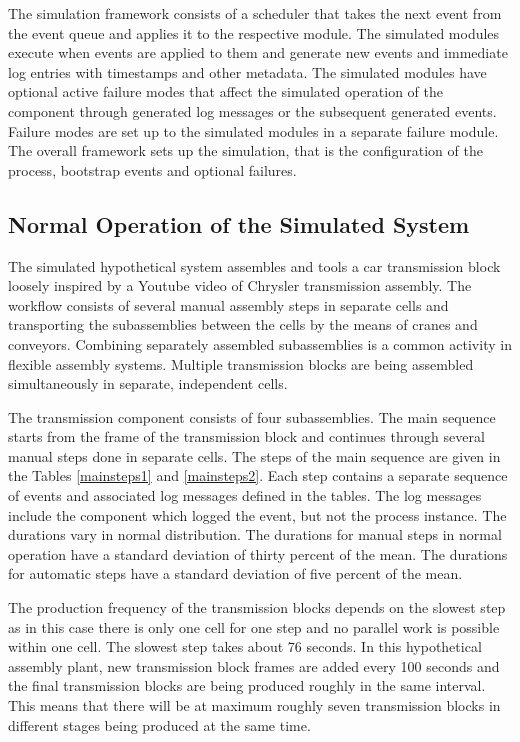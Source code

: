 \documentclass[journal]{IEEEtran}
\begin{document}
The simulation framework consists of a scheduler that takes the next event from the event queue and applies it to the respective module. The simulated modules
execute when events are applied to them and generate new events and immediate log entries with timestamps and other metadata.
The simulated modules have optional active failure modes that affect the simulated operation of the component through
generated log messages or the subsequent generated events. Failure modes are set up to the simulated modules in a separate failure module.
The overall framework sets up the simulation, that is the configuration of the process, bootstrap events and optional failures.

\subsection{Normal Operation of the Simulated System}
The simulated hypothetical system assembles and tools a car transmission block loosely inspired by a Youtube video of Chrysler transmission assembly\cite{transmission}.
The workflow consists of several manual assembly steps in separate cells and transporting the subassemblies between the cells by the means of
cranes and conveyors. Combining separately assembled subassemblies is a common activity in flexible assembly systems\cite{el1989simulation}.
Multiple transmission blocks are being assembled simultaneously in separate, independent cells.

The transmission component consists of four subassemblies. The main sequence starts from the frame of the transmission block
and continues through several manual steps done in separate cells. The steps of the main sequence are given in
the Tables \ref{mainsteps1} and \ref{mainsteps2}.
Each step contains a separate sequence of events and associated log messages defined in the tables. The log messages include the component which logged the event, but
not the process instance.
The durations vary in normal distribution. The durations for manual steps in normal operation have a standard deviation of thirty percent of the mean. The durations for automatic steps
have a standard deviation of five percent of the mean.

The production frequency of the transmission blocks depends on the slowest step as in this case there is only one cell for one step and no
parallel work is possible within one cell. The slowest step takes about 76 seconds. In this hypothetical assembly plant, new transmission block
frames are added every 100 seconds and the final transmission blocks are being produced roughly in the same interval. This means that there
will be at maximum roughly seven transmission blocks in different stages being produced at the same time.
\end{document}
